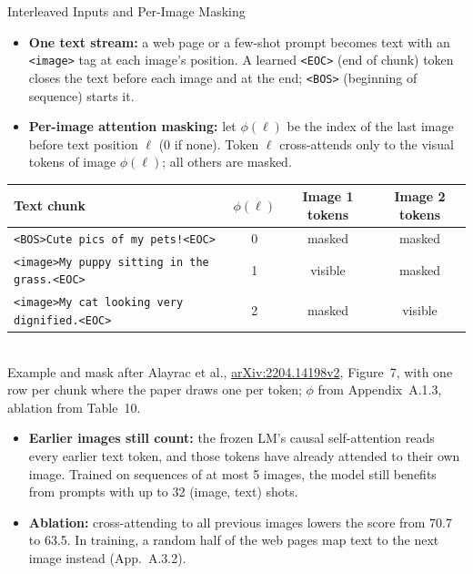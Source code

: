 \begin{frame}{Interleaved Inputs and Per-Image Masking}
  \begin{itemize}\footnotesize\itemsep0.3em
    \item \textbf{One text stream:} a web page or a few-shot prompt becomes text with an \texttt{<image>} tag at each image's position. A learned \texttt{<EOC>} (end of chunk) token closes the text before each image and at the end; \texttt{<BOS>} (beginning of sequence) starts it.
    \item \textbf{Per-image attention masking:} let $\phi(\ell)$ be the index of the last image before text position $\ell$ (0 if none). Token $\ell$ cross-attends only to the visual tokens of image $\phi(\ell)$; all others are masked.
  \end{itemize}
  {\centering\scriptsize
  \begin{tabular}{l c c c}
    \toprule
    \textbf{Text chunk} & $\phi(\ell)$ & \textbf{Image 1 tokens} & \textbf{Image 2 tokens} \\
    \midrule
    \texttt{<BOS>Cute pics of my pets!<EOC>} & 0 & masked & masked \\
    \texttt{<image>My puppy sitting in the grass.<EOC>} & 1 & visible & masked \\
    \texttt{<image>My cat looking very dignified.<EOC>} & 2 & masked & visible \\
    \bottomrule
  \end{tabular}\\[0.3em]
  Example and mask after Alayrac et al., \href{https://arxiv.org/abs/2204.14198v2}{arXiv:2204.14198v2}, Figure~7, with one row per chunk where the paper draws one per token; $\phi$ from Appendix~A.1.3, ablation from Table~10.\par}
  \begin{itemize}\footnotesize\itemsep0.3em
    \item \textbf{Earlier images still count:} the frozen LM's causal self-attention reads every earlier text token, and those tokens have already attended to their own image. Trained on sequences of at most 5 images, the model still benefits from prompts with up to 32 (image, text) shots.
    \item \textbf{Ablation:} cross-attending to all previous images lowers the score from 70.7 to 63.5. In training, a random half of the web pages map text to the next image instead (App.~A.3.2).
  \end{itemize}
\end{frame}

